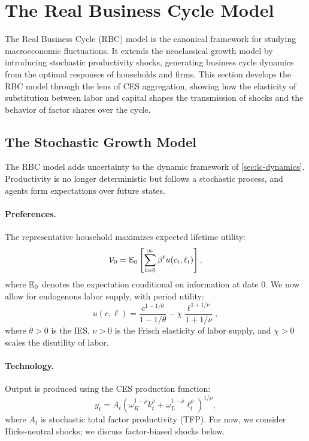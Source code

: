 \section{The Real Business Cycle Model}
\label{sec:rbc}

The Real Business Cycle (RBC) model is the canonical framework for studying macroeconomic fluctuations. It extends the neoclassical growth model by introducing stochastic productivity shocks, generating business cycle dynamics from the optimal responses of households and firms. This section develops the RBC model through the lens of CES aggregation, showing how the elasticity of substitution between labor and capital shapes the transmission of shocks and the behavior of factor shares over the cycle.

\subsection{The Stochastic Growth Model}
\label{subsec:stochastic-growth}

The RBC model adds uncertainty to the dynamic framework of \cref{sec:lc-dynamics}. Productivity is no longer deterministic but follows a stochastic process, and agents form expectations over future states.

\paragraph{Preferences.}
The representative household maximizes expected lifetime utility:
\begin{equation}
\mathcal{V}_0 = \mathbb{E}_0 \left[ \sum_{t=0}^{\infty} \beta^t u(c_t, \ell_t) \right],
\label{eq:rbc-utility}
\end{equation}
where $\mathbb{E}_0$ denotes the expectation conditional on information at date $0$. We now allow for endogenous labor supply, with period utility:
\begin{equation}
u(c, \ell) = \frac{c^{1-1/\theta}}{1 - 1/\theta} - \chi \frac{\ell^{1+1/\nu}}{1 + 1/\nu},
\label{eq:period-utility}
\end{equation}
where $\theta > 0$ is the IES, $\nu > 0$ is the Frisch elasticity of labor supply, and $\chi > 0$ scales the disutility of labor.

\paragraph{Technology.}
Output is produced using the CES production function:
\begin{equation}
y_t = A_t \left( \omega_K^{1-\rho} k_t^\rho + \omega_L^{1-\rho} \ell_t^\rho \right)^{1/\rho},
\label{eq:rbc-production}
\end{equation}
where $A_t$ is stochastic total factor productivity (TFP). For now, we consider Hicks-neutral shocks; we discuss factor-biased shocks below.

